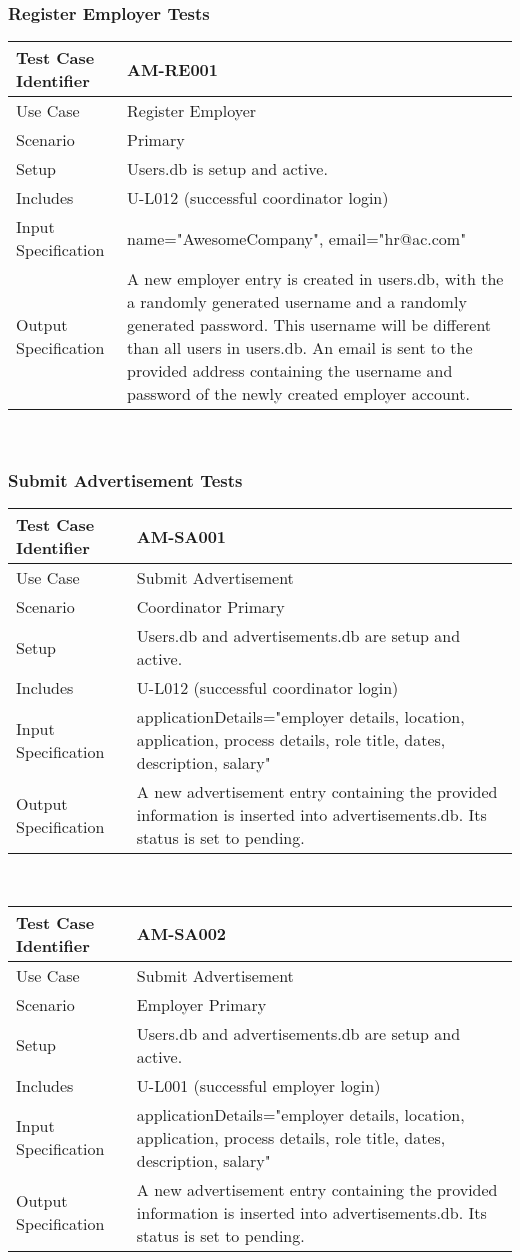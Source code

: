 \documentclass{l3deliverable}
\begin{document}
\subsubsection{Register Employer Tests}
\begin{tabular}{lp{10cm}}
\hline 
\textbf{Test Case Identifier} & AM-RE001\tabularnewline
\hline 
\hline 
Use Case & Register Employer \tabularnewline
\hline 
Scenario & Primary \tabularnewline
\hline 
Setup & Users.db is setup and active.\tabularnewline
\hline 
Includes & U-L012 (successful coordinator login) \tabularnewline
\hline 
Input Specification & name="AwesomeCompany", email="hr@ac.com" \tabularnewline
\hline 
Output Specification & A new employer entry is created in users.db, with the a randomly generated username and a randomly generated password. This username will be different than all users in users.db. An email is sent to the provided address containing the username and password of the newly created employer account.\tabularnewline
\hline 
\end{tabular}\\

\subsubsection{Submit Advertisement Tests}
\begin{tabular}{lp{10cm}}
\hline 
\textbf{Test Case Identifier} & AM-SA001\tabularnewline
\hline 
\hline 
Use Case & Submit Advertisement \tabularnewline
\hline 
Scenario & Coordinator Primary \tabularnewline
\hline 
Setup & Users.db and advertisements.db are setup and active.\tabularnewline
\hline 
Includes & U-L012 (successful coordinator login) \tabularnewline
\hline 
Input Specification & applicationDetails="employer details, location, application, process details, role title, dates, description, salary" \tabularnewline
\hline 
Output Specification & A new advertisement entry containing the provided information is inserted into advertisements.db. Its status is set to pending.\tabularnewline
\hline 
\end{tabular}\\

\begin{tabular}{lp{10cm}}
\hline 
\textbf{Test Case Identifier} & AM-SA002\tabularnewline
\hline 
\hline 
Use Case & Submit Advertisement \tabularnewline
\hline 
Scenario & Employer Primary \tabularnewline
\hline 
Setup & Users.db and advertisements.db are setup and active.\tabularnewline
\hline 
Includes & U-L001 (successful employer login) \tabularnewline
\hline 
Input Specification & applicationDetails="employer details, location, application, process details, role title, dates, description, salary" \tabularnewline
\hline 
Output Specification & A new advertisement entry containing the provided information is inserted into advertisements.db. Its status is set to pending.\tabularnewline
\hline 
\end{tabular}\\
\end{document}
